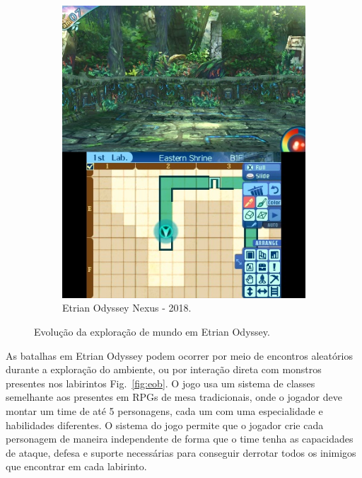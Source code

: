 \documentclass[
	12pt,				%
	openright,			%
	twoside,			%
	a4paper,			%
	english,			%
	french,				%
	spanish,			%
	brazil				%
	]{abntex2}
\begin{document}
\begin{figure}[h!]
\begin{subfigure}[b]{0.44\linewidth}
    \includegraphics[width=\linewidth]{eonexus.jpg}
    \caption{Etrian Odyssey Nexus - 2018.}
  \end{subfigure}
  \caption{Evolução da exploração de mundo em Etrian Odyssey.}
  \label{fig:eo}
\end{figure}

As batalhas em Etrian Odyssey podem ocorrer por meio de encontros aleatórios durante a exploração do ambiente, ou por interação direta com monstros presentes nos labirintos Fig.~\ref{fig:eob}. O jogo usa um sistema de classes semelhante aos presentes em RPGs de mesa tradicionais, onde o jogador deve montar um time de até 5 personagens, cada um com uma especialidade e habilidades diferentes. O sistema do jogo permite que o jogador crie cada personagem de maneira independente de forma que o time tenha as capacidades de ataque, defesa e suporte necessárias para conseguir derrotar todos os inimigos que encontrar em cada labirinto.
\end{document}
